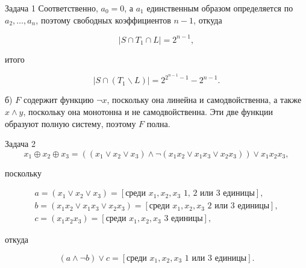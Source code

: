 \documentclass{article}
\newcommand{\abs}[1]{\left\lvert#1\right\rvert}
\renewcommand{\setminus}{\mathbin{\backslash}}
\begin{document}
\begin{section}{Задача 1}
		Соответственно, $a_0 = 0$, а $a_1$ единственным образом определяется по $a_2, \dots, a_n$, поэтому свободных коэффициентов $n - 1$, откуда

		\begin{equation*}
			\abs{S \cap T_1 \cap L} = 2^{n-1},
		\end{equation*}

		итого

		\begin{equation*}
			\abs{S \cap (T_1 \setminus L)} = 2^{2^{n-1}-1} - 2^{n-1}.
		\end{equation*}

		б) $F$ содержит функцию $\neg x$, поскольку она линейна и самодвойственна, а также $x \land y$, поскольку она монотонна и не самодвойственна. Эти две функции образуют полную систему, поэтому $F$ полна.
	\end{section}

	\begin{section}{Задача 2}
		\begin{equation*}
			x_1 \oplus x_2 \oplus x_3 = ((x_1 \lor x_2 \lor x_3) \land \neg (x_1 x_2 \lor x_1 x_3 \lor x_2 x_3)) \lor x_1 x_2 x_3,
		\end{equation*}

		поскольку

		\begin{gather*}
			a = (x_1 \lor x_2 \lor x_3) = [\text{среди } x_1, x_2, x_3 \text{ 1, 2 или 3 единицы}], \\
			b = (x_1 x_2 \lor x_1 x_3 \lor x_2 x_3) = [\text{среди } x_1, x_2, x_3 \text{ 2 или 3 единицы}], \\
			c = (x_1 x_2 x_3) = [\text{среди } x_1, x_2, x_3 \text{ 3 единицы}],
		\end{gather*}

		откуда

		\begin{equation*}
			(a \land \neg b) \lor c = [\text{среди } x_1, x_2, x_3 \text{ 1 или 3 единицы}].
		\end{equation*}
	\end{section}
\end{document}
